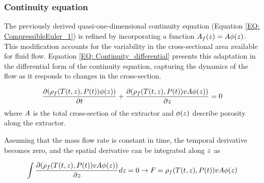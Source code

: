 \documentclass[../Article_Model_Parameters.tex]{subfiles}
\begin{document}
		
	\subsubsection{Continuity equation} \label{CH: Continuity}
	 
	
	The previously derived quasi-one-dimensional continuity equation (Equation \ref{EQ: CompressibleEuler_1}) is refined by incorporating a function ${\color{black}A_f}(z) = {\color{black}A\phi}(z)$. This modification accounts for the variability in the cross-sectional area available for fluid flow. Equation \ref{EQ: Continuity_differential} presents this adaptation in the differential form of the continuity equation, capturing the dynamics of the flow as it responds to changes in the cross-section.
	
	{\footnotesize
		\begin{equation} \label{EQ: Continuity_differential}
			\frac{\partial ({\color{black}\rho_f}({\color{black}T}(t,z),{\color{black}P}(t)) {\color{black}\phi}(z))}{\partial t} + \frac{\partial ({\color{black}\rho_f}({\color{black}T}(t,z),{\color{black}P}(t)) v {\color{black}A\phi}(z))}{\partial {\color{black}z}} = 0
		\end{equation}
	}
	where ${\color{black} A}$ is the total cross-section of the extractor and ${\color{black}\phi}(z)$ describe porosity along the extractor.
	
	
	Assuming that the mass flow rate is constant in time, the temporal derivative becomes zero, and the spatial derivative can be integrated along ${\color{black}z}$ as
	
	{\footnotesize
		\begin{equation}
			\int \frac{\partial ({\color{black}\rho_f}({\color{black}T}(t,z),{\color{black}P}(t)) v {\color{black}A \phi}(z) )}{\partial {\color{black}z}} dz = 0 \rightarrow {\color{black}F}={\color{black}\rho_f}({\color{black}T}(t,z),{\color{black}P}(t)) v {\color{black}A\phi}(z)
		\end{equation}
	}
	
\end{document}
